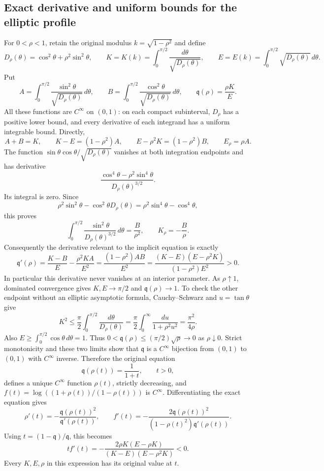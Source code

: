 \subsection{Exact derivative and uniform bounds for the elliptic profile}

For $0<\rho<1$, retain the original modulus
$k=\sqrt{1-\rho^2}$ and define
\[
 D_\rho(\theta)=\cos^2\theta+\rho^2\sin^2\theta,
 \qquad
 K=K(k)=\int_0^{\pi/2}\frac{d\theta}{\sqrt{D_\rho(\theta)}},
 \qquad
 E=E(k)=\int_0^{\pi/2}\sqrt{D_\rho(\theta)}\,d\theta.
\]
Put
\[
 A=\int_0^{\pi/2}\frac{\sin^2\theta}{\sqrt{D_\rho(\theta)}}\,d\theta,
 \qquad
 B=\int_0^{\pi/2}\frac{\cos^2\theta}{\sqrt{D_\rho(\theta)}}\,d\theta,
 \qquad \mathfrak q(\rho)=\frac{\rho K}{E}.
\]
All these functions are $C^\infty$ on $(0,1)$: on each compact
subinterval, $D_\rho$ has a positive lower bound, and every derivative
of each integrand has a uniform integrable bound. Directly,
\[
 A+B=K,\qquad K-E=(1-\rho^2)A,
 \qquad E-\rho^2K=(1-\rho^2)B,
 \qquad E_\rho=\rho A.
\]
The function $\sin\theta\cos\theta/\sqrt{D_\rho(\theta)}$
vanishes at both integration endpoints and has derivative
\[
 \frac{\cos^4\theta-\rho^2\sin^4\theta}
 {D_\rho(\theta)^{3/2}}.
\]
Its integral is zero. Since
\[
 \rho^2\sin^2\theta-\cos^2\theta D_\rho(\theta)
 =\rho^2\sin^4\theta-\cos^4\theta,
\]
this proves
\[
 \int_0^{\pi/2}\frac{\sin^2\theta}{D_\rho(\theta)^{3/2}}\,d\theta
 =\frac B{\rho^2},\qquad K_\rho=-\frac B\rho.
\]
Consequently the derivative relevant to the implicit equation is exactly
\[
 \boxed{
 \mathfrak q'(\rho)=\frac{K-B}{E}-\frac{\rho^2KA}{E^2}
 =\frac{(1-\rho^2)AB}{E^2}
 =\frac{(K-E)(E-\rho^2K)}{(1-\rho^2)E^2}>0.}
\]
In particular this derivative never vanishes at an interior parameter.
As $\rho\uparrow1$, dominated convergence gives $K,E\to\pi/2$
and $\mathfrak q(\rho)\to1$. To check the other endpoint without an elliptic
asymptotic formula, Cauchy--Schwarz and $u=\tan\theta$ give
\[
 K^2\le\frac\pi2\int_0^{\pi/2}\frac{d\theta}{D_\rho(\theta)}
 =\frac\pi2\int_0^\infty\frac{du}{1+\rho^2u^2}
 =\frac{\pi^2}{4\rho}.
\]
Also $E\ge\int_0^{\pi/2}\cos\theta\,d\theta=1$.
Thus $0<\mathfrak q(\rho)\le(\pi/2)\sqrt\rho\to0$ as $\rho\downarrow0$.
Strict monotonicity and these two limits show that $\mathfrak q$ is a
$C^\infty$ bijection from $(0,1)$ to $(0,1)$ with $C^\infty$ inverse.
Therefore the original equation
\[
 \mathfrak q(\rho(t))=\frac1{1+t},\qquad t>0,
\]
defines a unique $C^\infty$ function $\rho(t)$, strictly decreasing,
and $f(t)=\log((1+\rho(t))/(1-\rho(t)))$ is $C^\infty$.
Differentiating the exact equation gives
\[
 \rho'(t)=-\frac{\mathfrak q(\rho(t))^2}{\mathfrak q'(\rho(t))},\qquad
 f'(t)=-\frac{2\mathfrak q(\rho(t))^2}{(1-\rho(t)^2)\mathfrak q'(\rho(t))}.
\]
Using $t=(1-\mathfrak q)/\mathfrak q$, this becomes
\[
 \boxed{
 t f'(t)=-\frac{2\rho K(E-\rho K)}{(K-E)(E-\rho^2K)}<0.}
\]
Every $K,E,\rho$ in this expression has its original value at $t$.

